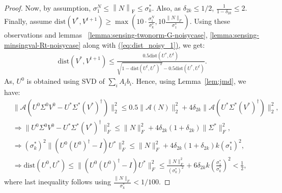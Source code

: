 \documentclass[11pt]{article}
\renewcommand{\eqref}[1]{\hyperref[#1]{(\ref*{#1})}}
\theoremstyle{plain}
\theoremstyle{definition}
\newcommand{\dist}{\mathrm{dist}}
\newcommand{\frob}[1]{\left\| {#1} \right\|_\text{F}}
\newcommand{\aff}{{\mathcal A}}
\newcommand{\Vt}{V^{t+1}}
\newcommand{\Ut}{U^{t}}
\newcommand{\Vo}{V^*}
\newcommand{\Uo}{U^*}
\newcommand{\sn}{\sigma^N}
\newcommand{\so}{\sigma^*}
\begin{document}
\begin{proof}
Now, by assumption, $\sn_1\leq \frob{N}\leq \so_k$. Also, as $\delta_{2k}\leq 1/2$, $\frac{1}{1-\delta_{2k}}\leq 2$. Finally, assume $\dist(\Vo, \Vt)\geq \max(10\cdot\frac{\sn_1}{\so_k}, 10\frac{\|N\|_F}{\sigma_1^*})$. Using these observations and lemmas~ \ref{lemma:sensing-twonorm-G-noisycase}, \ref{lemma:sensing-minsingval-Rt-noisycase} along with \eqref{eq:dist_noisy_1}, we get:
%
\begin{align}
  \dist(\Vo, \Vt)\leq \frac{0.5\dist(\Uo, \Ut)}{\sqrt{1-\dist(\Ut,\Uo)^2}-0.5\dist(\Uo, \Ut)}. \label{eq:dist_noisy_f}
\end{align}
As, $U^{0}$ is obtained using SVD of $\sum_i A_i b_i$. Hence, using Lemma~\ref{lem:jmd}, we have: %
\begin{align*}
 &\|\aff(U^{0}\Sigma^{0}V^{0}-U^*\Sigma^*(V^*)^\dag)\|_2^2\leq 0.5 \|\aff(N)\|_{2}^2+4\delta_{2k}\|\aff(U^*\Sigma^*(V^*)^\dag)\|_2^2,\\
&\Rightarrow \|U^{0}\Sigma^{0}V^{0}-U^*\Sigma^*(V^*)^\dag\|_F^2\leq \|N\|_{F}^2+4\delta_{2k}(1+\delta_{2k})\|\Sigma^*\|_F^2,\\
&\Rightarrow(\sigma_k^*)^2\|(U^{0}(U^{0})^\dag-I)U^*\|_F^2\leq \|N\|_{F}^2+4\delta_{2k}(1+\delta_{2k})k(\sigma_1^*)^2,\\
&\Rightarrow\dist(U^{0}, U^*)\leq \|(U^{0}(U^{0})^\dag-I)U^*\|_F^2\leq \frac{\|N\|_{F}^2}{(\so_k)^2}+6\delta_{2k}k\left(\frac{\sigma_1^*}{\sigma_k^*}\right)^2<\frac{1}{2},
\end{align*}
where last inequality follows using $\frac{\|N\|_{F}}{\so_k}<1/100$. 


\end{proof}
\end{document}
